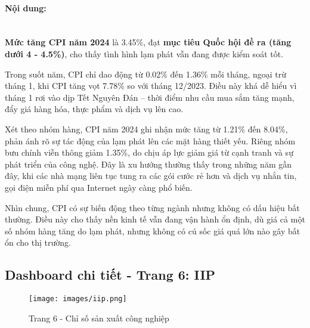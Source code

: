 \documentclass[a4paper]{report}
\begin{document}
{{\paragraph{Nội dung: } \mbox{}\\

\textbf{Mức tăng CPI năm 2024} là 3.45\%, đạt \textbf{mục tiêu Quốc hội đề ra (tăng dưới 4 - 4.5\%)}\cite{ref2}, cho thấy tình hình lạm phát vẫn đang được kiểm soát tốt.

Trong suốt năm, CPI chỉ dao động từ 0.02\% đến 1.36\% mỗi tháng, ngoại trừ tháng 1, khi CPI tăng vọt 7.78\% so với tháng 12/2023. Điều này khá dễ hiểu vì tháng 1 rơi vào dịp Tết Nguyên Đán – thời điểm nhu cầu mua sắm tăng mạnh, đẩy giá hàng hóa, thực phẩm và dịch vụ lên cao.

Xét theo nhóm hàng, CPI năm 2024 ghi nhận mức tăng từ 1.21\% đến 8.04\%, phản ánh rõ sự tác động của lạm phát lên các mặt hàng thiết yếu. Riêng nhóm bưu chính viễn thông giảm 1.35\%, do chịu áp lực giảm giá từ cạnh tranh và sự phát triển của công nghệ. Đây là xu hướng thường thấy trong những năm gần đây, khi các nhà mạng liên tục tung ra các gói cước rẻ hơn và dịch vụ nhắn tin, gọi điện miễn phí qua Internet ngày càng phổ biến.

Nhìn chung, CPI có sự biến động theo từng ngành nhưng không có dấu hiệu bất thường. Điều này cho thấy nền kinh tế vẫn đang vận hành ổn định, dù giá cả một số nhóm hàng tăng do lạm phát, nhưng không có cú sốc giá quá lớn nào gây bất ổn cho thị trường.
\newpage
\subsection{Dashboard chi tiết - Trang 6: IIP}

\begin{figure}[H]
    \centering
    \texttt{[image: images/iip.png]}
    \caption{Trang 6 - Chỉ số sản xuất công nghiệp}
    \label{fig:enter-label}
\end{figure}

}}
\end{document}
